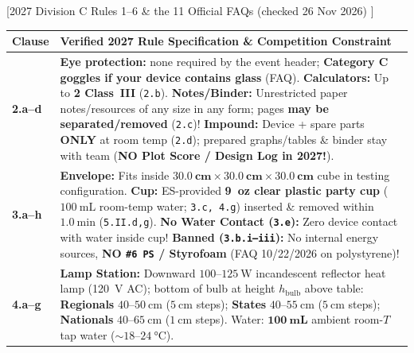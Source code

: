 \documentclass[10pt,twoside,openany,letterpaper]{book}
\begin{document}
\mainmatter
{}

\begin{quicksheet}\label{qr:01}
[2027 Division C Rules 1--6 \& the 11 Official FAQs (checked 26 Nov 2026) ]

\begin{twocol}[0.51]
\begin{rulebox}
\par\smallskip\noindent
\scriptsize\setlength{\tabcolsep}{2.5pt}\renewcommand{\arraystretch}{1.12}
\begin{tabularx}{\linewidth}{@{}l X@{}}
\toprule
\textbf{Clause} & \textbf{Verified 2027 Rule Specification \& Competition Constraint} \\
\midrule
\textbf{2.a--d} & \textbf{Eye protection:} none required by the event header; \textbf{Category C goggles if your device contains glass} (FAQ). \textbf{Calculators:} Up to \textbf{2 Class~III} (\texttt{2.b}). \textbf{Notes/Binder:} Unrestricted paper notes/resources of any size in any form; pages \textbf{may be separated/removed} (\texttt{2.c})! \textbf{Impound:} Device + spare parts \textbf{ONLY} at room temp (\texttt{2.d}); prepared graphs/tables \& binder stay with team (\textbf{NO Plot Score / Design Log in 2027!}). \\
\textbf{3.a--h} & \textbf{Envelope:} Fits inside $\mathbf{\SI{30.0}{\centi\meter}\times\SI{30.0}{\centi\meter}\times\SI{30.0}{\centi\meter}}$ cube in testing configuration. \textbf{Cup:} ES-provided \textbf{9~oz clear plastic party cup} ($\SI{100}{\milli\liter}$ room-temp water; \texttt{3.c, 4.g}) inserted \& removed within $\SI{1.0}{\minute}$ (\texttt{5.II.d,g}). \textbf{No Water Contact (\texttt{3.e}):} Zero device contact with water inside cup! \textbf{Banned (\texttt{3.b.i--iii}):} No internal energy sources, \textbf{NO \texttt{\#6 PS} / Styrofoam} (FAQ 10/22/2026 on polystyrene)! \\
\textbf{4.a--g} & \textbf{Lamp Station:} Downward $100\text{--}\SI{125}{\watt}$ incandescent reflector heat lamp (\SI{120}{\volt} AC); bottom of bulb at height $h_{\mathrm{bulb}}$ above table: \textbf{Regionals} $40\text{--}\SI{50}{\centi\meter}$ ($\SI{5}{\centi\meter}$ steps); \textbf{States} $40\text{--}\SI{55}{\centi\meter}$ ($\SI{5}{\centi\meter}$ steps); \textbf{Nationals} $40\text{--}\SI{65}{\centi\meter}$ ($\SI{1}{\centi\meter}$ steps). Water: $\mathbf{\SI{100}{\milli\liter}}$ ambient room-$T$ tap water ($\sim 18\text{--}\SI{24}{\celsius}$). \\

\end{tabularx}
\end{rulebox}
\end{twocol}
\end{quicksheet}
\end{document}

